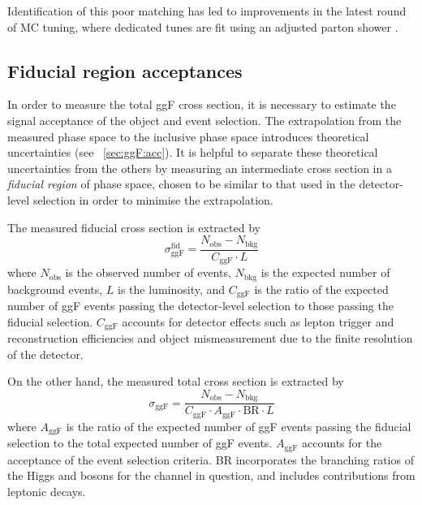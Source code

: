 Identification of this poor matching has led to improvements in the latest round of MC 
tuning, where dedicated  tunes are fit using an adjusted 
parton shower \cite{ATLAS:tune:2013}.



\subsection{Fiducial region acceptances}
\label{sec:ggF:fiducial}

In order to measure the total ggF cross section, it is necessary to estimate the signal 
acceptance of the object and event selection. The extrapolation from the measured phase 
space to the inclusive phase space introduces theoretical uncertainties (see 
\Section~\ref{sec:ggF:acc}). It is helpful to separate these theoretical uncertainties from 
the others by measuring an intermediate cross section in a \textit{fiducial region} of 
phase space, chosen to be similar to that used in the detector-level selection in order to 
minimise the extrapolation.

The measured fiducial cross section is extracted by
\begin{equation}
	\sigma_{\text{ggF}}^{\text{fid}} = \frac{N_{\text{obs}} - N_{\text{bkg}}}{C_{\text{ggF}} \cdot L}
	\label{eq:ggF:fid_xs}
\end{equation}
where $N_{\text{obs}}$ is the observed number of events, $N_{\text{bkg}}$ is the expected 
number of background events, $L$ is the luminosity, and $C_{\text{ggF}}$ is the ratio of 
the expected number of ggF events passing the detector-level selection to those passing 
the fiducial selection. $C_{\text{ggF}}$ accounts for detector effects such as lepton 
trigger and reconstruction efficiencies and object mismeasurement due to the finite 
resolution of the detector.

On the other hand, the measured total cross section is extracted by
\begin{equation}
	\sigma_{\text{ggF}} = \frac{N_{\text{obs}} - N_{\text{bkg}}}{C_{\text{ggF}} \cdot A_{\text{ggF}} \cdot \text{BR} \cdot L}
	\label{eq:ww:total_xs}
\end{equation}
where $A_{\text{ggF}}$ is the ratio of the expected number of ggF events passing the 
fiducial selection to the total expected number of ggF events. $A_{\text{ggF}}$ accounts 
for the acceptance of the event selection criteria. BR incorporates the branching 
ratios of the Higgs and \PW bosons for the channel in question, and includes contributions 
from leptonic \Ptau decays.

